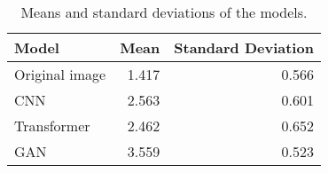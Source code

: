 \begin{table}
\centering
\caption{Means and standard deviations of the models.}
\label{tab:means}
\begin{tabular}{lrr}
\toprule
         Model &  Mean &  Standard Deviation \\
\midrule
Original image & 1.417 &               0.566 \\
           CNN & 2.563 &               0.601 \\
   Transformer & 2.462 &               0.652 \\
           GAN & 3.559 &               0.523 \\
\bottomrule
\end{tabular}
\end{table}
